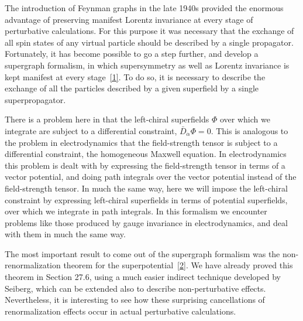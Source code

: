 
The introduction of Feynman graphs in the late 1940s provided the enormous
advantage of preserving manifest Lorentz invariance at every stage of
perturbative calculations. For this purpose it was necessary that the exchange
of all spin states of any virtual particle should be described by a single
propagator. Fortunately, it has become possible to go a step further, and
develop a supergraph formalism, in which supersymmetry as well as Lorentz
invariance is kept manifest at every stage~\hyperref[ch30-ref-1]{[1]}. To do
so, it is necessary to describe the exchange of all the particles described by
a given superfield by a single superpropagator.

There is a problem here in that the left-chiral superfields \(\Phi\) over which
we integrate are subject to a differential constraint,
\(\bar D_{\dot\alpha}\Phi=0\). This is analogous to the problem in electrodynamics
that the field-strength tensor is subject to a differential constraint, the
homogeneous Maxwell equation. In electrodynamics this problem is dealt with by
expressing the field-strength tensor in terms of a vector potential, and doing
path integrals over the vector potential instead of the field-strength tensor.
In much the same way, here we will impose the left-chiral constraint by
expressing left-chiral superfields in terms of potential superfields, over
which we integrate in path integrals. In this formalism we encounter problems
like those produced by gauge invariance in electrodynamics, and deal with them
in much the same way.

The most important result to come out of the supergraph formalism was the
non-renormalization theorem for the
superpotential~\hyperref[ch30-ref-2]{[2]}. We have already proved this theorem
in Section 27.6, using a much easier indirect technique developed by Seiberg,
which can be extended also to describe non-perturbative effects. Nevertheless,
it is interesting to see how these surprising cancellations of renormalization
effects occur in actual perturbative calculations.
